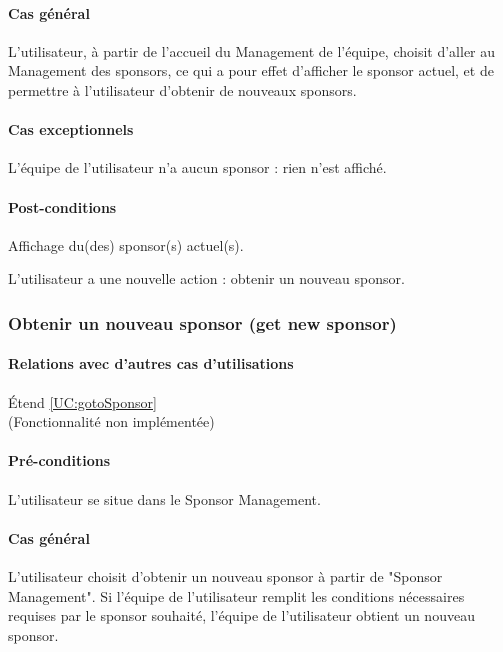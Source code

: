 \paragraph{Cas général}
L'utilisateur, à partir de l'accueil du Management de l'équipe, choisit d'aller au Management des sponsors, ce qui a pour effet d'afficher le sponsor actuel, et de permettre à l'utilisateur d'obtenir de nouveaux sponsors. 
\paragraph{Cas exceptionnels}
L'équipe de l'utilisateur n'a aucun sponsor : rien n'est affiché. 
\paragraph{Post-conditions}
\begin{list}{}{\leftmargin=1.5em}
\item{Affichage du(des) sponsor(s) actuel(s).}
\item{L'utilisateur a une nouvelle action : obtenir un nouveau sponsor.}
\end{list}

\subsubsection{Obtenir un nouveau sponsor (get new sponsor)}
\label{UC:getNewSponsor}
\paragraph{Relations avec d'autres cas d'utilisations}
Étend \ref{UC:gotoSponsor}
\\(Fonctionnalité non implémentée)
\paragraph{Pré-conditions}
\begin{list}{}{\leftmargin=1.5em}
\item{L'utilisateur se situe dans le Sponsor Management.}
\end{list}
\paragraph{Cas général}
L'utilisateur choisit d'obtenir un nouveau sponsor à partir de "Sponsor Management". Si l'équipe de l'utilisateur remplit les conditions nécessaires requises par le sponsor souhaité, l'équipe de l'utilisateur obtient un nouveau sponsor. 
